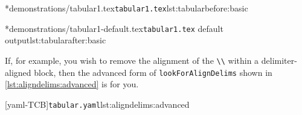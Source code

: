 	\begin{minipage}{.45\textwidth}
		\cmhlistingsfromfile[showspaces=false,showtabs=false]*{demonstrations/tabular1.tex}{\texttt{tabular1.tex}}{lst:tabularbefore:basic}
	\end{minipage}%
	\hfill
	\begin{minipage}{.45\textwidth}
		\cmhlistingsfromfile[showspaces=false,showtabs=false]*{demonstrations/tabular1-default.tex}{\texttt{tabular1.tex} default output}{lst:tabularafter:basic}
	\end{minipage}%

	If, for example, you wish to remove the alignment of the \lstinline!\\! within a delimiter-aligned block, then the advanced form of \texttt{lookForAlignDelims} shown in \cref{lst:aligndelims:advanced} is for you.

	[yaml-TCB]{\texttt{tabular.yaml}}{lst:aligndelims:advanced}

